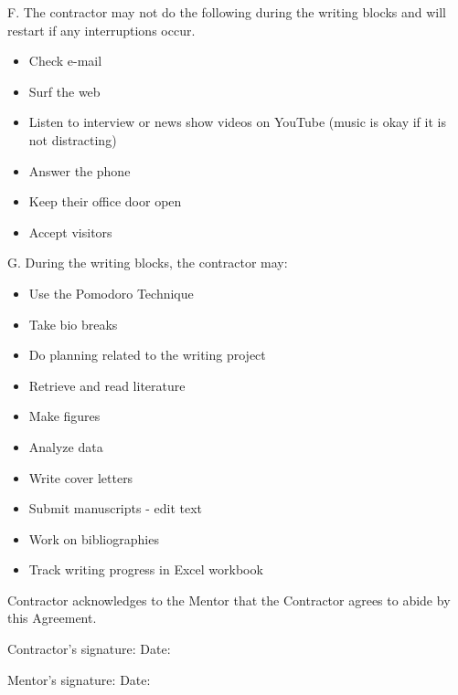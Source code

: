 \documentclass[9pt]{article}
\begin{document}
F. The contractor may not do the following during the writing blocks and will restart if any interruptions occur. 

\begin{itemize}
\item Check e-mail
\item Surf the web
\item Listen to interview or news show videos on YouTube (music is okay if it is not distracting)
\item Answer the phone
\item Keep their office door open
\item Accept visitors
\end{itemize}


G. During the writing blocks, the contractor may: 

\begin{itemize}
\item Use the Pomodoro Technique
\item Take bio breaks
\item Do planning related to the writing project
\item Retrieve and read literature
\item Make figures
\item Analyze data
\item Write cover letters
\item Submit manuscripts - edit text
\item Work on bibliographies
\item Track writing progress in Excel workbook
\end{itemize}


Contractor acknowledges to the Mentor that the Contractor agrees to abide by this Agreement.

Contractor's signature:   \hspace{3.5in}                              Date:

Mentor's signature:  \hspace{3.73in}                                  Date: 
\end{document}
